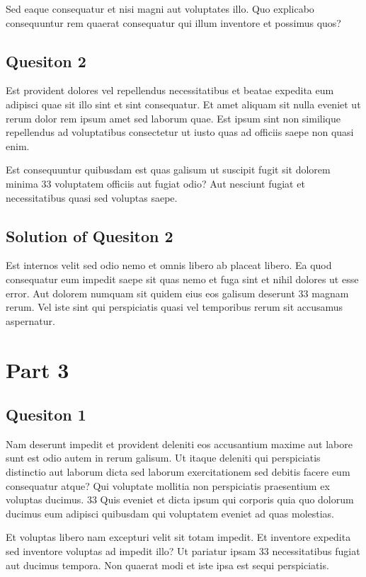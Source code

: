 \documentclass[11pt]{article}
\begin{document}
Sed eaque consequatur et nisi magni aut voluptates illo. Quo explicabo consequuntur rem quaerat consequatur qui illum inventore et possimus quos?

\subsection*{Quesiton 2}

Est provident dolores vel repellendus necessitatibus et beatae expedita eum adipisci quae sit illo sint et sint consequatur. Et amet aliquam sit nulla eveniet ut rerum dolor rem ipsum amet sed laborum quae. Est ipsum sint non similique repellendus ad voluptatibus consectetur ut iusto quas ad officiis saepe non quasi enim.

Est consequuntur quibusdam est quas galisum ut suscipit fugit sit dolorem minima 33 voluptatem officiis aut fugiat odio? Aut nesciunt fugiat et necessitatibus quasi sed voluptas saepe.

\subsection*{Solution of Quesiton 2}

Est internos velit sed odio nemo et omnis libero ab placeat libero. Ea quod consequatur eum impedit saepe sit quas nemo et fuga sint et nihil dolores ut esse error. Aut dolorem numquam sit quidem eius eos galisum deserunt 33 magnam rerum. Vel iste sint qui perspiciatis quasi vel temporibus rerum sit accusamus aspernatur.

\section*{Part 3}


\subsection*{Quesiton 1}

Nam deserunt impedit et provident deleniti eos accusantium maxime aut labore sunt est odio autem in rerum galisum. Ut itaque deleniti qui perspiciatis distinctio aut laborum dicta sed laborum exercitationem sed debitis facere eum consequatur atque? Qui voluptate mollitia non perspiciatis praesentium ex voluptas ducimus. 33 Quis eveniet et dicta ipsum qui corporis quia quo dolorum ducimus eum adipisci quibusdam qui voluptatem eveniet ad quas molestias.

Et voluptas libero nam excepturi velit sit totam impedit. Et inventore expedita sed inventore voluptas ad impedit illo? Ut pariatur ipsam 33 necessitatibus fugiat aut ducimus tempora. Non quaerat modi et iste ipsa est sequi perspiciatis.
\end{document}
